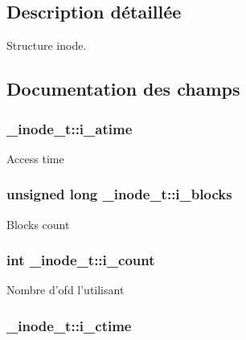 \subsection{Description détaillée}
Structure inode. 

\subsection{Documentation des champs}
\hypertarget{struct__inode__t_a01f50c6c44a3b50e4414a794643b741f}{
\subsubsection[{i\+\_\+atime}]{ \+\_\+inode\+\_\+t\+::i\+\_\+atime}}\label{struct__inode__t_a01f50c6c44a3b50e4414a794643b741f}
Access time \hypertarget{struct__inode__t_a92ebe4c1e93af9fba4efae4d07e14858}{
\subsubsection[{i\+\_\+blocks}]{\setlength{\rightskip}{0pt plus 5cm}unsigned long \+\_\+inode\+\_\+t\+::i\+\_\+blocks}}\label{struct__inode__t_a92ebe4c1e93af9fba4efae4d07e14858}
Blocks count \hypertarget{struct__inode__t_a8ea768d56d01e010bc0c809bc38dbb28}{
\subsubsection[{i\+\_\+count}]{\setlength{\rightskip}{0pt plus 5cm}int \+\_\+inode\+\_\+t\+::i\+\_\+count}}\label{struct__inode__t_a8ea768d56d01e010bc0c809bc38dbb28}
Nombre d'ofd l'utilisant \hypertarget{struct__inode__t_a73ee1e604547b74b8e1045fd4f6699b6}{
\subsubsection[{i\+\_\+ctime}]{ \+\_\+inode\+\_\+t\+::i\+\_\+ctime}}\label{struct__inode__t_a73ee1e604547b74b8e1045fd4f6699b6}
